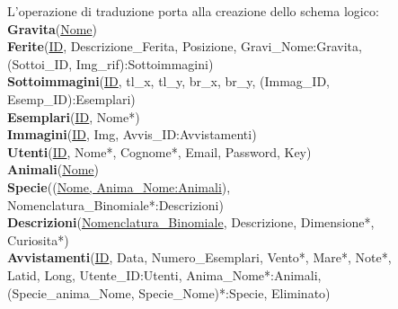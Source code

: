 \documentclass[a4paper,final,12pt]{report}
\newcommand\tab[1][13mm]{\hspace*{#1}}
\begin{document}
L'operazione di traduzione porta alla creazione dello schema logico:\\
\textbf{Gravita}(\underline{Nome})\\
\textbf{Ferite}(\underline{ID}, Descrizione\_Ferita, Posizione, Gravi\_Nome:Gravita, \\ \tab (Sottoi\_ID, Img\_rif):Sottoimmagini)\\
\textbf{Sottoimmagini}(\underline{ID}, tl\_x, tl\_y, br\_x, br\_y, (Immag\_ID, Esemp\_ID):Esemplari)\\
\textbf{Esemplari}(\underline{ID}, Nome*)\\
\textbf{Immagini}(\underline{ID}, Img, Avvis\_ID:Avvistamenti)\\
\textbf{Utenti}(\underline{ID}, Nome*, Cognome*, Email, Password, Key)\\
\textbf{Animali}(\underline{Nome})\\
\textbf{Specie}((\underline{Nome, Anima\_Nome:Animali}),\\ \tab Nomenclatura\_Binomiale*:Descrizioni)\\
\textbf{Descrizioni}(\underline{Nomenclatura\_Binomiale}, Descrizione, Dimensione*,\\ \tab Curiosita*)\\
\textbf{Avvistamenti}(\underline{ID}, Data, Numero\_Esemplari, Vento*, Mare*, Note*,\\ \tab Latid, Long, Utente\_ID:Utenti, Anima\_Nome*:Animali,\\ \tab (Specie\_anima\_Nome, Specie\_Nome)*:Specie, Eliminato)\\

\newpage
\end{document}
